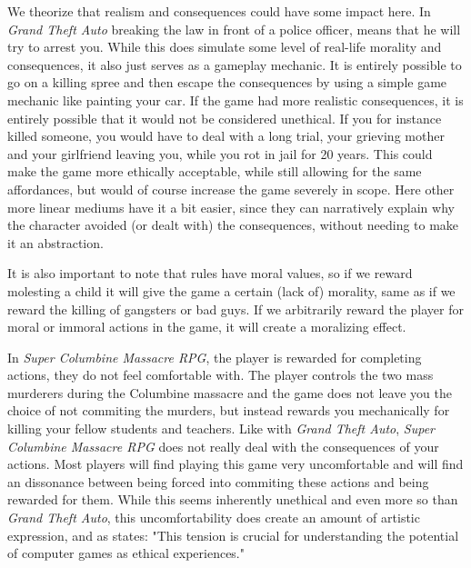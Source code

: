 We theorize that realism and consequences could have some impact here. In \textit{Grand Theft Auto} breaking the law in front of a police officer, means that he will try to arrest you. While this does simulate some level of real-life morality and consequences, it also just serves as a gameplay mechanic. It is entirely possible to go on a killing spree and then escape the consequences by using a simple game mechanic like painting your car. If the game had more realistic consequences, it is entirely possible that it would not be considered unethical. If you for instance killed someone, you would have to deal with a long trial, your grieving mother and your girlfriend leaving you, while you rot in jail for 20 years. This could make the game more ethically acceptable, while still allowing for the same affordances, but would of course increase the game severely in scope. Here other more linear mediums have it a bit easier, since they can narratively explain why the character avoided (or dealt with) the consequences, without needing to make it an abstraction. \

It is also important to note that rules have moral values, so if we reward molesting a child it will give the game a certain (lack of) morality, same as if we reward the killing of gangsters or bad guys. If we arbitrarily reward the player for moral or immoral actions in the game, it will create a moralizing effect.\ 

In \textit{Super Columbine Massacre RPG}\cite{ledone2005super}, the player is rewarded for completing actions, they do not feel comfortable with. The player controls the two mass murderers during the Columbine massacre and the game does not leave you the choice of not commiting the murders, but instead rewards you mechanically for killing your fellow students and teachers. Like with \textit{Grand Theft Auto}, \textit{Super Columbine Massacre RPG} does not really deal with the consequences of your actions. Most players will find playing this game very uncomfortable and will find an dissonance between being forced into commiting these actions and being rewarded for them. While this seems inherently unethical and even more so than \textit{Grand Theft Auto}, this uncomfortability does create an amount of artistic expression, and as \citep{sicart2011ethics} states: "This tension is crucial for understanding the potential of computer games as ethical experiences."
\ \commenting{important: bring it up in the conclusion.} \

